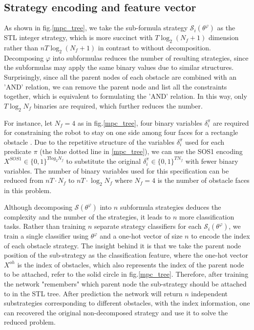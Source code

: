 \documentclass[a4paper]{report}
\begin{document}
\subsection{Strategy encoding and feature vector}
\label{Strategy encoding and feature vector}

As shown in fig.\ref{mpc_tree}, we take the sub-formula strategy $\mathcal{S}_i(\theta^\varphi)$ as the STL integer strategy, which is more succinct with $T\log_2(N_f+1)$ dimension rather than $nT\log_2(N_f+1)$ in contrast to without decomposition. Decomposing $\varphi$ into subformulas reduces the number of resulting strategies, since the subformulas may apply the same binary values due to similar structures. Surprisingly, since all the parent nodes of each obstacle are combined with an 'AND' relation, we can remove the parent node and list all the constraints together, which is equivalent to formulating the 'AND' relation. In this way, only $T\log_2N_f$ binaries are required, which further reduces the number. 
 
For instance, let $N_f =4$ as in fig.\ref*{mpc_tree}, four binary variables $\delta_i^{\pi}$ are required for constraining the robot to stay on one side among four faces for a rectangle obstacle \cite{bertsimas2022online}\cite{Cauligi2020}. Due to the repetitive structure of the variables $\delta_i^{\pi}$ used for each predicate $\pi$ (the blue dotted line in \ref{mpc_tree}), we can use the SOS1 encoding $X^{SOS1} \in \{0,1\}^{Tlog_2N_f}$ to substitute the original $\delta_{i}^{\pi} \in \{0,1\}^{TN_f}$ with fewer binary variables. The number of binary variables used for this specification can be reduced from $nT\cdot N_f$ to $nT\cdot \log_2N_f$ where $N_f=4$ is the number of obstacle faces in this problem.

Although decomposing $\mathcal{S}(\theta^\varphi)$ into $n$ subformula strategies deduces the complexity and the number of the strategies, it leads to $n$ more classification tasks. Rather than training $n$ separate strategy classifiers for each $\mathcal{S}_i(\theta^\varphi)$, we train a single classifier using $\theta^\varphi$ and a one-hot vector of size $n$ to encode the index of each obstacle strategy. The insight behind it is that we take the parent node position of the sub-strategy as the classification feature, where the one-hot vector $X^{oh}$ is the index of obstacles, which also represents the index of the parent node to be attached, refer to the solid circle in fig.\ref{mpc_tree}. Therefore, after training the network "remembers" which parent node the sub-strategy should be attached to in the STL tree. After prediction the network will return $n$ independent substrategies corresponding to different obstacles, with the index information, one can recovered the original non-decomposed strategy and use it to solve the reduced problem. 
\end{document}
